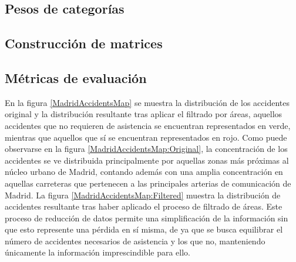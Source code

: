 \documentclass{uathesis-es}
\begin{document}
\subsection{Pesos de categorías}

\subsection{Construcción de matrices}

\subsection{Métricas de evaluación}



En la figura \ref{MadridAccidentsMap} se muestra la distribución de los accidentes original y la distribución resultante tras aplicar el filtrado por áreas, aquellos accidentes que no requieren de asistencia se encuentran representados en verde, mientras que aquellos que sí se encuentran representados en rojo. Como puede observarse en la figura \ref{MadridAccidentsMap:Original}, la concentración de los accidentes se ve distribuida principalmente por aquellas zonas más próximas al núcleo urbano de Madrid, contando además con una amplia concentración en aquellas carreteras que pertenecen a las principales arterias de comunicación de Madrid. La figura  \ref{MadridAccidentsMap:Filtered} muestra la distribución de accidentes resultante tras haber aplicado el proceso de filtrado de áreas. Este proceso de reducción de datos permite una simplificación de la información sin que esto represente una pérdida en sí misma, de ya que se busca equilibrar el número de accidentes necesarios de asistencia y los que no, manteniendo únicamente la información imprescindible para ello.
\end{document}

